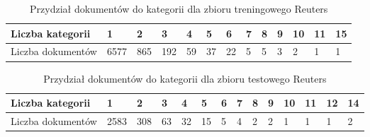 \documentclass{pracamgr}
\begin{document}
\begin{table}[H]
\centering
\begin{tabular}{|l|l|l|l|l|l|l|l|l|l|l|l|l|}
\hline
Liczba kategorii & 1 & 2 & 3 & 4 & 5 & 6 & 7 & 8 & 9 & 10 & 11 & 15 \\ \hline
Liczba dokumentów & 6577 & 865 & 192 & 59 & 37 & 22 & 5 & 5 & 3 & 2 & 1 & 1 \\ \hline
\end{tabular}
\caption{Przydział dokumentów do kategorii dla zbioru treningowego Reuters}
\label{reuters-train}
\end{table}

\begin{table}[H]
\centering
\begin{tabular}{|l|l|l|l|l|l|l|l|l|l|l|l|l|l|}
\hline
Liczba kategorii & 1 & 2 & 3 & 4 & 5 & 6 & 7 & 8 & 9 & 10 & 11 & 12 & 14 \\ \hline
Liczba dokumentów & 2583 & 308 & 63 & 32 & 15 & 5 & 4 & 2 & 2 & 1 & 1 & 1 & 2 \\ \hline
\end{tabular}
\caption{Przydział dokumentów do kategorii dla zbioru testowego Reuters}
\label{reuters-test}
\end{table}
\end{document}
